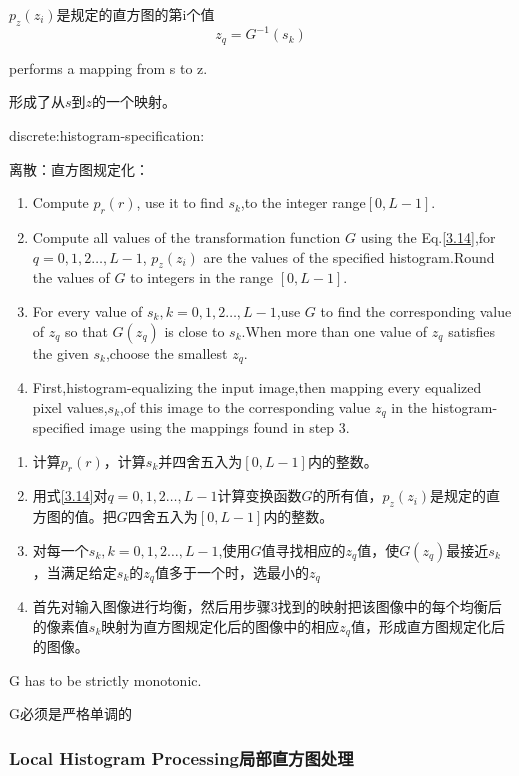 \documentclass[a4paper,12pt]{article}
\numberwithin{equation}{section}%
\begin{document}
$p_z(z_{i})$是规定的直方图的第i个值
\begin{equation} \label {3.16}
z_{q}=G^{-1}(s_{k})
\end{equation}

performs a mapping from s to z.

形成了从$s$到$z$的一个映射。

discrete:histogram-specification:

离散：直方图规定化：

\begin{enumerate}
\item Compute $p_{r}(r)$, use it to find $s_{k}$,to the integer range$[0,L-1]$.
\item Compute all values of the transformation function $G$ using the Eq.\ref{3.14},for $q=0,1,2\ldots,L-1$, $p_{z}(z_{i})$ are the values of the specified histogram.Round the values of $G$ to integers in the range   $[0,L-1]$.
\item For every value of $s_{k},k=0,1,2\ldots,L-1$,use $G$ to find the corresponding value of $z_{q}$ so that $G(z_{q})$ is close to $s_{k}$.When more than one value of $z_{q}$ satisfies the given $s_{k}$,choose  the smallest $z_{q}$.
\item First,histogram-equalizing the input image,then mapping every equalized pixel values,$s_{k}$,of this image to the corresponding value  $z_{q}$ in the histogram-specified image using the mappings found in step 3.
\end{enumerate}

\begin{enumerate}
\item 计算$p_{r}(r)$，计算$s_{k}$并四舍五入为$[0,L-1]$内的整数。
\item 用式\ref{3.14}对$q=0,1,2\ldots,L-1$计算变换函数$G$的所有值，$p_{z}(z_{i})$是规定的直方图的值。把$G$四舍五入为$[0,L-1]$内的整数。
\item 对每一个$s_{k},k=0,1,2\ldots,L-1$,使用$G$值寻找相应的$z_{q}$值，使$G(z_{q})$最接近$s_{k}$，当满足给定$s_{k}$的$z_{q}$值多于一个时，选最小的$z_{q}$
\item 首先对输入图像进行均衡，然后用步骤3找到的映射把该图像中的每个均衡后的像素值$s_{k}$映射为直方图规定化后的图像中的相应$z_{q}$值，形成直方图规定化后的图像。
\end{enumerate}

G has to be strictly monotonic.

G必须是严格单调的

\subsubsection{Local Histogram Processing局部直方图处理}
\end{document}
